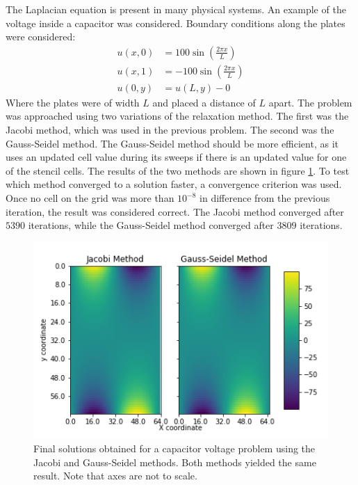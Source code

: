 \documentclass[twocolumn]{article}
\begin{document}
The Laplacian equation is present in many physical systems. An example of the voltage inside a capacitor was considered. Boundary conditions along the plates were considered:
\begin{equation}
\begin{split}
u(x,0) &= 100\sin(\frac{2\pi x}{L}) \\
u(x,1) &= -100\sin(\frac{2\pi x}{L}) \\
u(0,y) &= u(L,y) - 0
\end{split}
\end{equation}
Where the plates were of width $L$ and placed a distance of $L$ apart. The problem was approached using two variations of the relaxation method. The first was the Jacobi method, which was used in the previous problem. The second was the Gauss-Seidel method. The Gauss-Seidel method should be more efficient, as it uses an updated cell value during its sweeps if there is an updated value for one of the stencil cells. The results of the two methods are shown in figure \ref{fig:capacitor_methods}. To test which method converged to a solution faster, a convergence criterion was used. Once no cell on the grid was more than $10^{-8}$ in difference from the previous iteration, the result was considered correct. The Jacobi method converged after $5390$ iterations, while the Gauss-Seidel method converged after $3809$ iterations.

\begin{figure}
\centering
\includegraphics[width=\linewidth]{capacitor_methods}
\caption{Final solutions obtained for a capacitor voltage problem using the Jacobi and Gauss-Seidel methods. Both methods yielded the same result. Note that axes are not to scale.}
\label{fig:capacitor_methods}
\end{figure}
\end{document}
